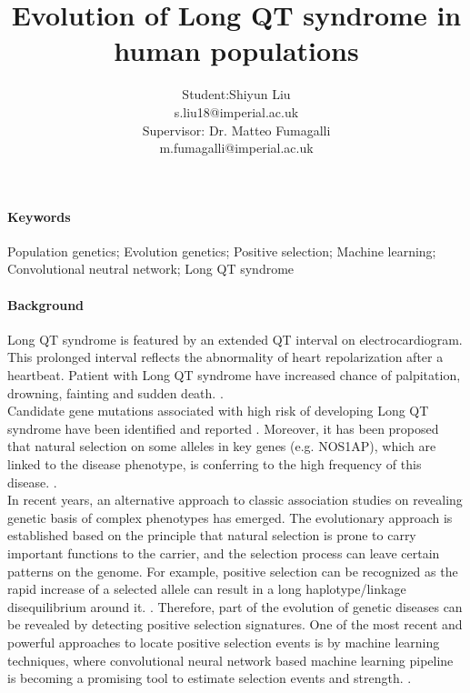 \documentclass[11pt,a4paper]{article}
\title{Evolution of Long QT syndrome in human populations }
\author{Student:Shiyun Liu\\ s.liu18@imperial.ac.uk \\ Supervisor: Dr. Matteo Fumagalli\\ m.fumagalli@imperial.ac.uk}
\date{}
\begin{document}
\maketitle

\newpage
\paragraph{Keywords}
Population genetics; Evolution genetics; Positive selection; Machine learning; Convolutional neutral network; Long QT syndrome

\paragraph{Background}
Long QT syndrome is featured by an extended QT interval on electrocardiogram. This prolonged interval reflects the abnormality of heart repolarization after a heartbeat. Patient with Long QT syndrome have increased chance of palpitation, drowning, fainting and sudden death.
\cite{Morita}.
\\
Candidate gene mutations associated with high risk of developing Long QT syndrome have been identified and reported 
\cite{Pfeufer}.
Moreover, it has been proposed that natural selection on some alleles in key genes (e.g. NOS1AP), which are linked to the disease phenotype, is conferring to the high frequency of this disease.
\cite{Newton-Cheh}.
\\
In recent years, an alternative approach to classic association studies on revealing genetic basis of complex phenotypes has emerged. The evolutionary approach is established based on the principle that natural selection is prone to carry important functions to the carrier, and the selection process can leave certain patterns on the genome. For example, positive selection can be recognized as the rapid increase of a selected allele can result in a long haplotype/linkage disequilibrium around it.
\cite{Pavlidis}.
Therefore, part of the evolution of genetic diseases can be revealed by detecting positive selection signatures. One of the most recent and powerful approaches to locate positive selection events is by machine learning techniques, where convolutional neural network based machine learning pipeline is becoming a promising tool to estimate selection events and strength.
\cite{Schrider}.
\end{document}
